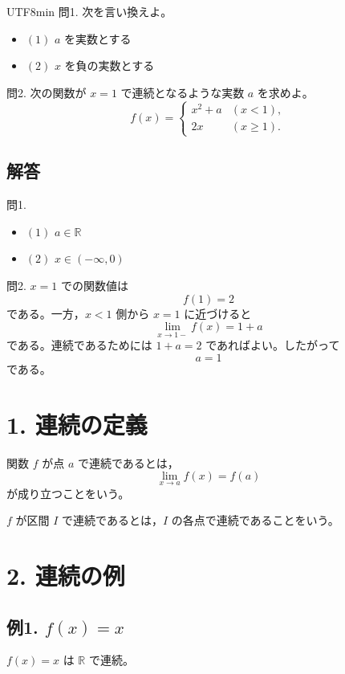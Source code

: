 \documentclass[a4paper,12pt]{article}
\begin{document}
\begin{CJK}{UTF8}{min}
問1. 次を言い換えよ。
\begin{itemize}
\item $(1)$ $a$ を実数とする
\item $(2)$ $x$ を負の実数とする
\end{itemize}

問2. 次の関数が $x=1$ で連続となるような実数 $a$ を求めよ。
\[
f(x)=
\begin{cases}
x^2+a & (x<1),\\
2x & (x\ge 1).
\end{cases}
\]

\subsection*{解答}

問1.
\begin{itemize}
\item $(1)$ $a\in \mathbb{R}$
\item $(2)$ $x\in (-\infty,0)$
\end{itemize}

問2. $x=1$ での関数値は
\[
f(1)=2
\]
である。一方，$x<1$ 側から $x=1$ に近づけると
\[
\lim_{x\to 1-} f(x)=1+a
\]
である。連続であるためには $1+a=2$ であればよい。したがって
\[
a=1
\]
である。

\section*{1. 連続の定義}

\begin{definition}
関数 $f$ が点 $a$ で連続であるとは，
\[
\lim_{x \to a} f(x)=f(a)
\]
が成り立つことをいう。
\end{definition}

$f$ が区間 $I$ で連続であるとは，$I$ の各点で連続であることをいう。

\section*{2. 連続の例}

\subsection*{例1. $f(x)=x$}

$f(x)=x$ は $\mathbb{R}$ で連続。

\begin{center}
\end{center}


\end{CJK}
\end{document}
